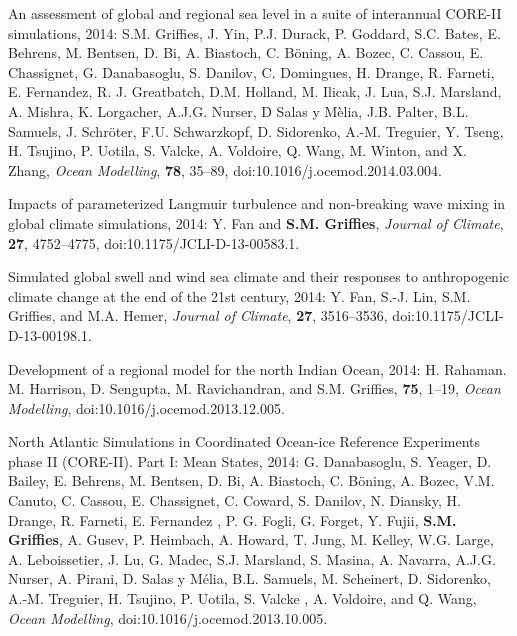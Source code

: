\begin{etaremune}
\item An assessment of global and regional sea level in a suite of
  interannual CORE-II simulations, 2014: S.M. Grif\/f\/ies,
  J. Yin, P.J. Durack, P. Goddard, S.C. Bates, E. Behrens, M. Bentsen,
  D. Bi, A. Biastoch, C. B\"oning, A. Bozec, C. Cassou, E. Chassignet,
  G. Danabasoglu, S. Danilov, C. Domingues, H. Drange, R. Farneti,
  E. Fernandez, R. J. Greatbatch, D.M. Holland, M. Ilicak, J. Lua,
  S.J. Marsland, A. Mishra, K. Lorgacher, A.J.G. Nurser, D Salas y
  M\`elia, J.B.  Palter, B.L. Samuels, J. Schr\"oter, F.U. Schwarzkopf, D. Sidorenko, A.-M. Treguier, Y. Tseng,
  H. Tsujino, P. Uotila, S. Valcke, A. Voldoire, Q. Wang, M. Winton,
  and X. Zhang, {\it Ocean Modelling}, {\bf 78}, 35--89,
  doi:10.1016/j.ocemod.2014.03.004.

\item Impacts of parameterized Langmuir turbulence and non-breaking
  wave mixing in global climate simulations, 2014: Y. Fan and {\bf
    S.M. Grif\/f\/ies}, {\it Journal of Climate}, {\bf 27},
  4752--4775, doi:10.1175/JCLI-D-13-00583.1.

\item Simulated global swell and wind sea climate and their responses
  to anthropogenic climate change at the end of the 21st century,
  2014: Y. Fan, S.-J. Lin, S.M. Grif\/f\/ies, and M.A. Hemer,
  {\it Journal of Climate}, {\bf 27}, 3516--3536,
  doi:10.1175/JCLI-D-13-00198.1.

\item Development of a regional model for the north Indian Ocean,
  2014: H. Rahaman. M. Harrison, D. Sengupta, M.  Ravichandran, and
  S.M. Grif\/f\/ies, {\bf 75}, 1--19, {\it Ocean Modelling},
  doi:10.1016/j.ocemod.2013.12.005.

\item North Atlantic Simulations in Coordinated Ocean-ice Reference
  Experiments phase II (CORE-II). Part I: Mean States, 2014: G.
  Danabasoglu, S. Yeager, D. Bailey, E. Behrens, M. Bentsen, D. Bi,
  A. Biastoch, C. {B\"{o}ning}, A. Bozec, V.M. Canuto, C. Cassou,
  E. Chassignet, C. Coward, S. Danilov, N. Diansky, H. Drange,
  R. Farneti, E. Fernandez , P. G. Fogli, G. Forget, Y. Fujii, {\bf
    S.M. Grif\/f\/ies}, A.  Gusev, P. Heimbach, A.  Howard, T. Jung,
  M. Kelley, W.G. Large, A. Leboissetier, J. Lu, G. Madec,
  S.J. Marsland, S. Masina, A. Navarra, A.J.G. Nurser, A. Pirani,
  D. Salas y {M\'{e}lia}, B.L. Samuels, M. Scheinert, D. Sidorenko,
  A.-M. Treguier, H. Tsujino, P.   Uotila, S. Valcke , A. Voldoire, and
  Q. Wang, {\it Ocean Modelling}, doi:10.1016/j.ocemod.2013.10.005.


\end{etaremune}
